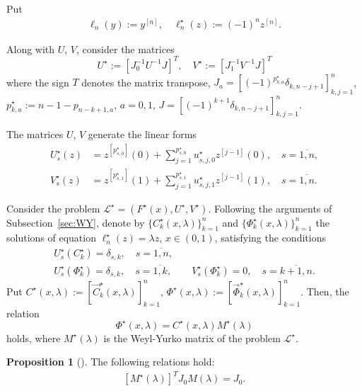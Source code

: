 \documentclass[reqno,12pt,centertags]{amsart}
\numberwithin{equation}{section}
\theoremstyle{definition}
\newtheorem{proposition}[theorem]{Proposition}
\begin{document}
Put
\begin{gather*}
	\ell_n(y) := y^{[n]}, \quad \ell_n^{\star}(z) := (-1)^n z^{[n]}.
\end{gather*}


Along with $U$, $V$, consider the matrices 
\begin{equation*} \label{defUs}
	U^{\star} := [J_0^{-1} U^{-1} J]^T,\quad V^{\star} := [J_1^{-1} V^{-1} J]^T
\end{equation*}
where the sign $T$ denotes the matrix transpose, $J_a = [(-1)^{p_{k,a}^{\star}}\delta_{k,n-j+1}]_{k,j = 1}^n$, $p_{k,a}^{\star} := n - 1 - p_{n-k+1, a}$, $a = 0, 1$, $J=[(-1)^{k+1}\delta_{k,n-j+1}]_{k,j = 1}^n$.

The matrices $U$, $V$ generate the linear forms
\begin{align*}
U_{s}^{\star}(z) & = z^{[p_{s,0}^{\star}]}(0) + \sum_{j = 1}^{p_{s,0}^{\star}} u_{s,j,0}^{\star} z^{[j-1]}(0), \quad s = \overline{1, n}, \\
V_{s}^{\star}(z) & = z^{[p_{s,1}^{\star}]}(1) + \sum_{j = 1}^{p_{s,1}^{\star}} u_{s,j,1}^{\star} z^{[j-1]}(1), \quad s = \overline{1, n}.
\end{align*}

Consider the problem  $\mathcal L^{\star} = (F^{\star}(x), U^{\star}, V^{\star})$. Following the arguments of Subsection~\ref{sec:WY}, denote by $\{ C_k^{\star}(x, \lambda) \}_{k = 1}^n$ and $\{ \Phi_k^{\star}(x, \lambda) \}_{k = 1}^n$ the solutions of equation $\ell_n^{\star}(z) = \lambda z$, $x \in (0, 1)$, satisfying the conditions
\begin{gather*} \nonumber
	U^{\star}_{s} (C_k^{\star}) = \delta_{s,k}, \quad s = \overline{1, n}, \\ \label{bcPhis}
	U_{s}^{\star}(\Phi_k^{\star}) = \delta_{s,k}, \quad s = \overline{1, k}, \qquad
	V_{s}^{\star}(\Phi_k^{\star}) = 0, \quad s = \overline{k+1,n}.
\end{gather*}
Put $C^{\star}(x, \lambda) := [\vec C_k^{\star}(x, \lambda)]_{k = 1}^n$, $\Phi^{\star}(x, \lambda) := [\vec \Phi_k^{\star}(x, \lambda)]_{k = 1}^n$.
Then, the relation 
\begin{equation} \label{relMs}
	\Phi^{\star}(x, \lambda) = C^{\star}(x, \lambda) M^{\star}(\lambda)
\end{equation}
holds, where $M^{\star}(\lambda)$ is the Weyl-Yurko matrix of the problem $\mathcal L^{\star}$. 

\begin{proposition}[\cite{Bon1}] \label{lem:M}
	The following relations hold:
	\begin{gather*} \label{MJM}
		[M^{\star}(\lambda)]^T J_0 M(\lambda) = J_0.
	\end{gather*}
\end{proposition}
\end{document}
